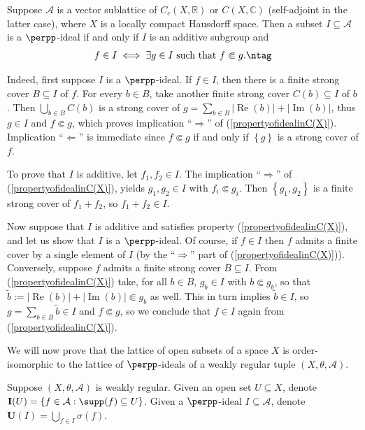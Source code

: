 \begin{example}
Suppose $\mathcal{A}$ is a vector sublattice of $C_c(X,\mathbb{R})$ or $C(X,\mathbb{C})$ (self-adjoint in the latter case), where $X$ is a locally compact Hausdorff space. Then a subset $I\subseteq\mathcal{A}$ is a $\perpp$-ideal if and only if $I$ is an additive subgroup and
\[f\in I\iff\exists g\in I\text{ such that }f\Subset g.\ntag\label{propertyofidealinC(X)}\]

Indeed, first suppose $I$ is a $\perpp$-ideal. If $f\in I$, then there is a finite strong cover $B\subseteq I$ of $f$. For every $b\in B$, take another finite strong cover $C(b)\subseteq I$ of $b$. Then $\bigcup_{b\in B}C(b)$ is a strong cover of $g=\sum_{b\in B}|\operatorname{Re}(b)|+|\operatorname{Im}(b)|$, thus $g\in I$ and $f\Subset g$, which proves implication ``$\Rightarrow$'' of (\ref{propertyofidealinC(X)}). Implication ``$\Leftarrow$'' is immediate since $f\Subset g$ if and only if $\left\{g\right\}$ is a strong cover of $f$.

To prove that $I$ is additive, let $f_1,f_2\in I$. The implication ``$\Rightarrow$'' of (\ref{propertyofidealinC(X)}), yields $g_1,g_2\in I$ with $f_i\Subset g_i$. Then $\left\{g_1,g_2\right\}$ is a finite strong cover of $f_1+f_2$, so $f_1+f_2\in I$.

Now suppose that $I$ is additive and satisfies property (\ref{propertyofidealinC(X)}), and let us show that $I$ is a $\perpp$-ideal. Of course, if $f\in I$ then $f$ admits a finite cover by a single element of $I$ (by the ``$\Rightarrow$'' part of (\ref{propertyofidealinC(X)})). Conversely, suppose $f$ admits a finite strong cover $B\subseteq I$. From (\ref{propertyofidealinC(X)}) take, for all $b\in B$, $g_b\in I$ with $b\Subset g_b$, so that $\widetilde{b}:=|\operatorname{Re}(b)|+|\operatorname{Im}(b)|\Subset g_b$ as well. This in turn implies $\widetilde{b}\in I$, so $g=\sum_{b\in B}\widetilde{b}\in I$ and $f\Subset g$, so we conclude that $f\in I$ again from (\ref{propertyofidealinC(X)}).
\end{example}

We will now prove that the lattice of open subsets of a space $X$ is order-isomorphic to the lattice of $\perpp$-ideals of a weakly regular tuple $(X,\theta,\mathcal{A})$.

\begin{definition}
Suppose $(X,\theta,\mathcal{A})$ is weakly regular. Given an open set $U\subseteq X$, denote $\mathbf{I}(U)=\left\{f\in\mathcal{A}:\supp(f)\subseteq U\right\}$. Given a $\perpp$-ideal $I\subseteq\mathcal{A}$, denote $\mathbf{U}(I)=\bigcup_{f\in I}\sigma(f)$.
\end{definition}

